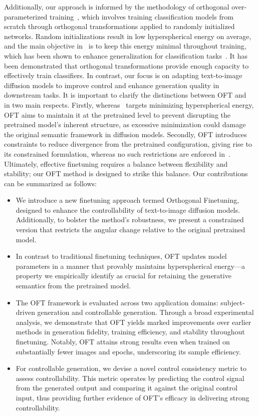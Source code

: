 Additionally, our approach is informed by the methodology of orthogonal over-parameterized training~\cite{liu2021orthogonal}, which involves training classification models from scratch through orthogonal transformations applied to randomly initialized networks. Random initializations result in low hyperspherical energy on average, and the main objective in~\cite{liu2021orthogonal} is to keep this energy minimal throughout training, which has been shown to enhance generalization for classification tasks~\cite{liu2018learning,lin2020regularizing}. It has been demonstrated that orthogonal transformations provide enough capacity to effectively train classifiers. In contrast, our focus is on adapting text-to-image diffusion models to improve control and enhance generation quality in downstream tasks. It is important to clarify the distinctions between OFT and~\cite{liu2021orthogonal} in two main respects. Firstly, whereas~\cite{liu2021orthogonal} targets minimizing hyperspherical energy, OFT aims to maintain it at the pretrained level to prevent disrupting the pretrained model’s inherent structure, as excessive minimization could damage the original semantic framework in diffusion models. Secondly, OFT introduces constraints to reduce divergence from the pretrained configuration, giving rise to its constrained formulation, whereas no such restrictions are enforced in~\cite{liu2021orthogonal}. Ultimately, effective finetuning requires a balance between flexibility and stability; our OFT method is designed to strike this balance. Our contributions can be summarized as follows:

\begin{itemize}[leftmargin=*,nosep]

    \item We introduce a new finetuning approach termed Orthogonal Finetuning, designed to enhance the controllability of text-to-image diffusion models. Additionally, to bolster the method’s robustness, we present a constrained version that restricts the angular change relative to the original pretrained model.
    \item In contrast to traditional finetuning techniques, OFT updates model parameters in a manner that provably maintains hyperspherical energy—a property we empirically identify as crucial for retaining the generative semantics from the pretrained model.
    \item The OFT framework is evaluated across two application domains: subject-driven generation and controllable generation. Through a broad experimental analysis, we demonstrate that OFT yields marked improvements over earlier methods in generation fidelity, training efficiency, and stability throughout finetuning. Notably, OFT attains strong results even when trained on substantially fewer images and epochs, underscoring its sample efficiency.
    \item For controllable generation, we devise a novel control consistency metric to assess controllability. This metric operates by predicting the control signal from the generated output and comparing it against the original control input, thus providing further evidence of OFT’s efficacy in delivering strong controllability.
\end{itemize}

